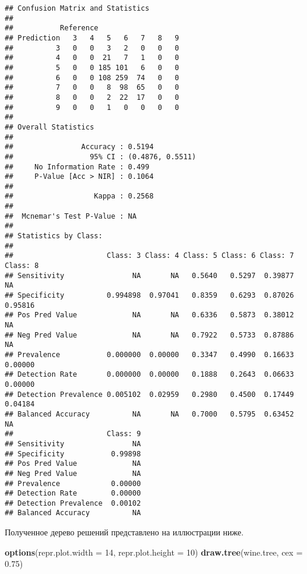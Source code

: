 \documentclass[
]{article}
\newenvironment{Shaded}{\begin{snugshade}}{\end{snugshade}}
\newcommand{\DataTypeTok}[1]{\textcolor[rgb]{0.13,0.29,0.53}{#1}}
\newcommand{\DecValTok}[1]{\textcolor[rgb]{0.00,0.00,0.81}{#1}}
\newcommand{\FloatTok}[1]{\textcolor[rgb]{0.00,0.00,0.81}{#1}}
\newcommand{\KeywordTok}[1]{\textcolor[rgb]{0.13,0.29,0.53}{\textbf{#1}}}
\newcommand{\NormalTok}[1]{#1}
\begin{document}
\begin{verbatim}
## Confusion Matrix and Statistics
## 
##           Reference
## Prediction   3   4   5   6   7   8   9
##          3   0   0   3   2   0   0   0
##          4   0   0  21   7   1   0   0
##          5   0   0 185 101   6   0   0
##          6   0   0 108 259  74   0   0
##          7   0   0   8  98  65   0   0
##          8   0   0   2  22  17   0   0
##          9   0   0   1   0   0   0   0
## 
## Overall Statistics
##                                           
##                Accuracy : 0.5194          
##                  95% CI : (0.4876, 0.5511)
##     No Information Rate : 0.499           
##     P-Value [Acc > NIR] : 0.1064          
##                                           
##                   Kappa : 0.2568          
##                                           
##  Mcnemar's Test P-Value : NA              
## 
## Statistics by Class:
## 
##                      Class: 3 Class: 4 Class: 5 Class: 6 Class: 7 Class: 8
## Sensitivity                NA       NA   0.5640   0.5297  0.39877       NA
## Specificity          0.994898  0.97041   0.8359   0.6293  0.87026  0.95816
## Pos Pred Value             NA       NA   0.6336   0.5873  0.38012       NA
## Neg Pred Value             NA       NA   0.7922   0.5733  0.87886       NA
## Prevalence           0.000000  0.00000   0.3347   0.4990  0.16633  0.00000
## Detection Rate       0.000000  0.00000   0.1888   0.2643  0.06633  0.00000
## Detection Prevalence 0.005102  0.02959   0.2980   0.4500  0.17449  0.04184
## Balanced Accuracy          NA       NA   0.7000   0.5795  0.63452       NA
##                      Class: 9
## Sensitivity                NA
## Specificity           0.99898
## Pos Pred Value             NA
## Neg Pred Value             NA
## Prevalence            0.00000
## Detection Rate        0.00000
## Detection Prevalence  0.00102
## Balanced Accuracy          NA
\end{verbatim}

Полученное дерево решений представлено на иллюстрации ниже.

\begin{Shaded}
\begin{Highlighting}[]
\KeywordTok{options}\NormalTok{(}\DataTypeTok{repr.plot.width =} \DecValTok{14}\NormalTok{, }\DataTypeTok{repr.plot.height =} \DecValTok{10}\NormalTok{)}
\KeywordTok{draw.tree}\NormalTok{(wine.tree, }\DataTypeTok{cex =} \FloatTok{0.75}\NormalTok{)}
\end{Highlighting}
\end{Shaded}
\end{document}
